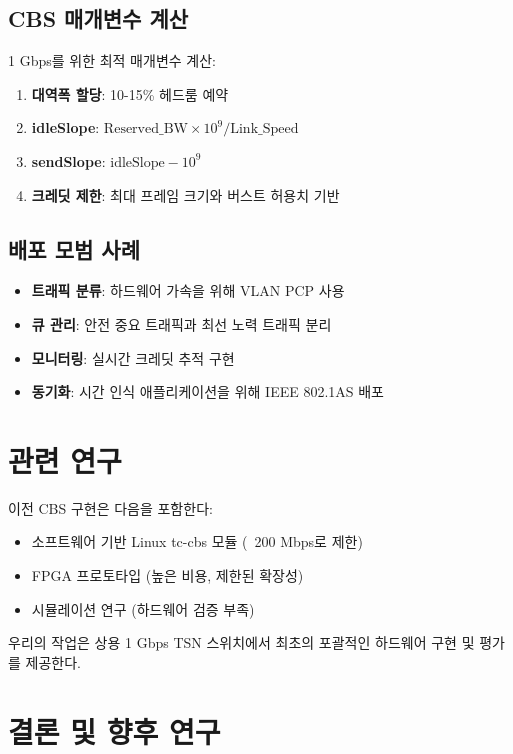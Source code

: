\documentclass[12pt, a4paper]{article}
\begin{document}
\subsection{CBS 매개변수 계산}

1 Gbps를 위한 최적 매개변수 계산:

\begin{enumerate}
    \item \textbf{대역폭 할당}: 10-15\% 헤드룸 예약
    \item \textbf{idleSlope}: $\text{Reserved\_BW} \times 10^9 / \text{Link\_Speed}$
    \item \textbf{sendSlope}: $\text{idleSlope} - 10^9$
    \item \textbf{크레딧 제한}: 최대 프레임 크기와 버스트 허용치 기반
\end{enumerate}

\subsection{배포 모범 사례}

\begin{itemize}
    \item \textbf{트래픽 분류}: 하드웨어 가속을 위해 VLAN PCP 사용
    \item \textbf{큐 관리}: 안전 중요 트래픽과 최선 노력 트래픽 분리
    \item \textbf{모니터링}: 실시간 크레딧 추적 구현
    \item \textbf{동기화}: 시간 인식 애플리케이션을 위해 IEEE 802.1AS 배포
\end{itemize}

\section{관련 연구}

이전 CBS 구현은 다음을 포함한다:
\begin{itemize}
    \item 소프트웨어 기반 Linux tc-cbs 모듈 (~200 Mbps로 제한)
    \item FPGA 프로토타입 (높은 비용, 제한된 확장성)
    \item 시뮬레이션 연구 (하드웨어 검증 부족)
\end{itemize}

우리의 작업은 상용 1 Gbps TSN 스위치에서 최초의 포괄적인 하드웨어 구현 및 평가를 제공한다.

\section{결론 및 향후 연구}
\end{document}
